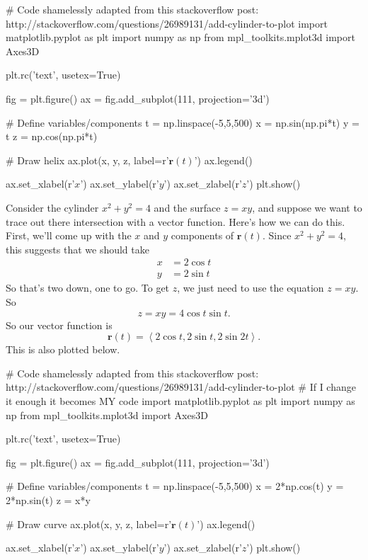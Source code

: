 \documentclass[10pt,]{book}
\theoremstyle{ptxplainnotitle}
\theoremstyle{ptxplaintitle}
\theoremstyle{ptxplainnotitle}
\theoremstyle{ptxplaintitle}
\theoremstyle{ptxplainnotitle}
\theoremstyle{ptxplaintitle}
\theoremstyle{ptxdefinitionnotitle}
\theoremstyle{ptxdefinitiontitle}
\theoremstyle{ptxdefinitionnotitle}
\theoremstyle{ptxdefinitiontitle}
\theoremstyle{ptxdefinitionnotitle}
\theoremstyle{ptxdefinitiontitle}
\theoremstyle{ptxdefinitionnotitle}
\theoremstyle{ptxdefinitiontitle}
\theoremstyle{ptxdefinitionnotitle}
\theoremstyle{ptxdefinitiontitle}
\numberwithin{equation}{section}
\newcommand{\vv}[1]{\mathbf{#1}}
\newcommand{\dotprod}[1]{\left\langle #1 \right\rangle}
\begin{document}
\begin{sageinput}
# Code shamelessly adapted from this stackoverflow post: http://stackoverflow.com/questions/26989131/add-cylinder-to-plot
import matplotlib.pyplot as plt
import numpy as np
from mpl_toolkits.mplot3d import Axes3D

plt.rc('text', usetex=True)

fig = plt.figure()
ax = fig.add_subplot(111, projection='3d')

# Define variables/components
t = np.linspace(-5,5,500)
x = np.sin(np.pi*t)
y = t
z = np.cos(np.pi*t)

# Draw helix
ax.plot(x, y, z, label=r'$\mathbf{r}(t)$')
ax.legend()

ax.set_xlabel(r'$x$')
ax.set_ylabel(r'$y$')
ax.set_zlabel(r'$z$')
plt.show()
\end{sageinput}
\begin{example}\label{example-finding-vector-functions}
\hypertarget{p-915}{}%
Consider the cylinder \(x^{2}+y^{2}=4\) and the surface \(z=xy\), and suppose we want to trace out there intersection with a vector function. Here's how we can do this. First, we'll come up with the \(x\) and \(y\) components of \(\vv{r}(t)\). Since \(x^{2}+y^{2} = 4\), this suggests that we should take%
%
\begin{align*}
x & = 2\cos t \\
y & = 2\sin t 
\end{align*}
\hypertarget{p-916}{}%
So that's two down, one to go. To get \(z\), we just need to use the equation \(z=xy\). So%
%
\begin{equation*}
z = xy = 4\cos t\sin t.
\end{equation*}
\hypertarget{p-917}{}%
So our vector function is%
%
\begin{equation*}
\vv{r}(t) = \dotprod{2\cos t, 2\sin t, 2\sin 2t}.
\end{equation*}
\hypertarget{p-918}{}%
This is also plotted below.%
\end{example}
\begin{sageinput}
# Code shamelessly adapted from this stackoverflow post: http://stackoverflow.com/questions/26989131/add-cylinder-to-plot
# If I change it enough it becomes MY code
import matplotlib.pyplot as plt
import numpy as np
from mpl_toolkits.mplot3d import Axes3D

plt.rc('text', usetex=True)

fig = plt.figure()
ax = fig.add_subplot(111, projection='3d')

# Define variables/components
t = np.linspace(-5,5,500)
x = 2*np.cos(t)
y = 2*np.sin(t)
z = x*y

# Draw curve
ax.plot(x, y, z, label=r'$\mathbf{r}(t)$')
ax.legend()

ax.set_xlabel(r'$x$')
ax.set_ylabel(r'$y$')
ax.set_zlabel(r'$z$')
plt.show()
\end{sageinput}
\typeout{************************************************}
\typeout{************************************************}
\end{document}
